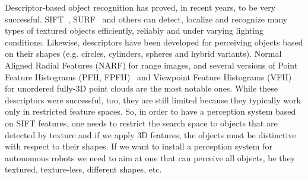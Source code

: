 \documentclass[letterpaper, 10 pt, conference]{sty/ieeeconf}
\begin{document}
Descriptor-based object recognition has proved, in recent years, to be very successful.
SIFT~\cite{lowe04distinctive}, SURF~\cite{surf} and others can
detect, localize and recognize many types of textured objects efficiently, reliably
and under varying lighting conditions. Likewise, descriptors have been developed 
for perceiving objects based on their shapes (e.g. circles, cylinders, spheres and hybrid variants).
Normal Aligned Radial Features (NARF)\cite{steder10irosws} for range images, 
and several versions of Point Feature  Histograms (PFH, FPFH)~\cite{Rusu09ICRA} and 
Viewpoint Feature Histograms (VFH)~\cite{vfh} for unordered fully-3D point clouds 
are the most notable ones. While these descriptors were successful, too, they are still limited because they
typically work only in restricted feature spaces. So, in order to have a perception system
based on SIFT features, one needs to restrict the search space to objects that are detected by
texture and if we apply 3D features, the objects must be distinctive with respect to their shapes. 
If we want to install a perception system for autonomous robots we need to aim 
at one that can perceive all objects, be they textured, texture-less, different shapes, etc.
\end{document}
